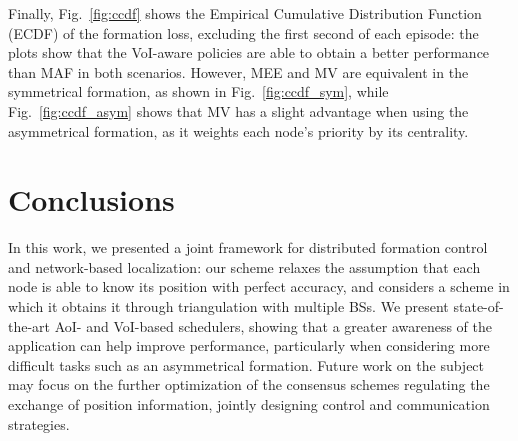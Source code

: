 \documentclass{ifac/ifacconf}
\begin{document}
Finally, Fig.~\ref{fig:ccdf} shows the Empirical Cumulative Distribution Function (ECDF) of the formation loss, excluding the first second of each episode: the plots show that the VoI-aware policies are able to obtain a better performance than MAF in both scenarios. However, MEE and MV are equivalent in the symmetrical formation, as shown in Fig.~\ref{fig:ccdf_sym}, while Fig.~\ref{fig:ccdf_asym} shows that MV has a slight advantage when using the asymmetrical formation, as it weights each node's priority by its centrality.

\section{Conclusions}
\label{sec:conc}
In this work, we presented a joint framework for distributed formation control and network-based localization: our scheme relaxes the assumption that each node is able to know its position with perfect accuracy, and considers a scheme in which it obtains it through triangulation with multiple BSs. We present state-of-the-art AoI- and VoI-based schedulers, showing that a greater awareness of the application can help improve performance, particularly when considering more difficult tasks such as an asymmetrical formation. Future work on the subject may focus on the further optimization of the consensus schemes regulating the exchange of position information, jointly designing control and communication strategies.










\end{document}
